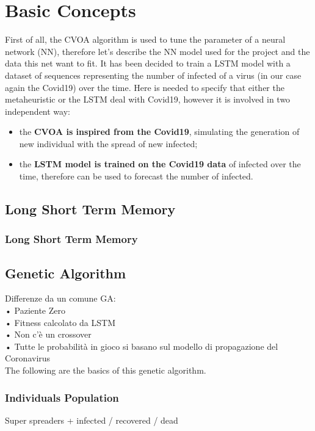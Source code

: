 \documentclass[letterpaper]{article}%
\begin{document}
\section{Basic Concepts}
First of all, the CVOA algorithm is used to tune the parameter of a neural network (NN), therefore let's describe the NN model used for the project and the data this net want to fit.
It has been decided to train a LSTM model with a dataset of sequences representing the number of infected of a virus (in our case again the Covid19) over the time. Here is needed to specify that either the metaheuristic or the LSTM deal with Covid19, however it is involved in two independent way:
\begin{itemize}
	\item the \textbf{CVOA is inspired from the Covid19}, simulating the generation of new individual with the spread of new infected;
	\item the \textbf{LSTM model is trained on the Covid19 data} of infected over the time, therefore can be used to forecast the number of infected.
\end{itemize}


\subsection{Long Short Term Memory}
\subsubsection{Long Short Term Memory}
\subsection{Genetic Algorithm}
Differenze da un comune GA:\\
• Paziente Zero\\
• Fitness calcolato da LSTM\\
• Non c’è un crossover\\
• Tutte le probabilità in gioco si basano sul modello di propagazione del Coronavirus\\

The following are the basics of this genetic algorithm.\\
\subsubsection{Individuals Population}
Super spreaders + infected / recovered / dead\\
\end{document}
